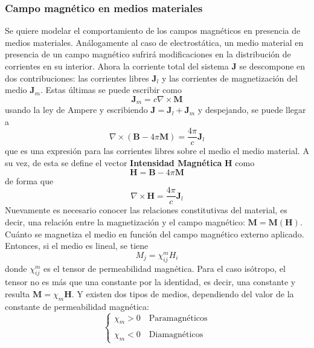 

\subsubsection{Campo magnético en medios materiales}
Se quiere modelar el comportamiento de los campos magnéticos en presencia de medios materiales. Análogamente al caso de electrostática, un medio material en presencia de un campo magnético sufrirá modificaciones en la distribución de corrientes en su interior. Ahora la corriente total del sistema $\textbf{J}$ se descompone en dos contribuciones: las corrientes libres $\textbf{J}_{l}$ y las corrientes de magnetización del medio $\textbf{J}_{m}$. Estas últimas se puede escribir como
\begin{equation*}
    \textbf{J}_{m} = c\nabla \times \textbf{M}
\end{equation*}
usando la ley de Ampere y escribiendo $\textbf{J} = \textbf{J}_{l} + \textbf{J}_{m}$ y despejando, se puede llegar a 
\begin{equation*}
    \nabla \times (\textbf{B} - 4\pi \textbf{M}) = \frac{4\pi}{c}\textbf{J}_{l}
\end{equation*}
que es una expresión para las corrientes libres sobre el medio el medio material. A su vez, de esta se define el vector \textbf{Intensidad Magnética} $\textbf{H}$ como
\begin{equation*}
    \textbf{H} = \textbf{B} - 4\pi \textbf{M}
\end{equation*}
de forma que
\begin{equation*}
    \nabla \times \textbf{H} = \frac{4\pi}{c}\textbf{J}_{l}
\end{equation*}
Nuevamente es necesario conocer las relaciones constitutivas del material, es decir, una relación entre la magnetización y el campo magnético: $\textbf{M} = \textbf{M}(\textbf{H})$. Cuánto se magnetiza el medio en función del campo magnético externo aplicado. Entonces, si el medio es lineal, se tiene
\begin{equation*}
    M_{j} = \chi_{ij}^{m}H_{i}
\end{equation*}
donde $\chi_{ij}^{m}$ es el tensor de permeabilidad magnética. Para el caso isótropo, el tensor no es más que una constante por la identidad, es decir, una constante y resulta $\textbf{M} = \chi_{m} \textbf{H}$. Y existen dos tipos de medios, dependiendo del valor de la constante de permeabilidad magnética: 
\begin{equation*}
    \left\{
        \begin{matrix}
            \chi_{m} > 0 \quad \mbox{Paramagnéticos}\\
            \\
            \chi_{m} < 0 \quad \mbox{Diamagnéticos}
        \end{matrix}
    \right.
\end{equation*}

